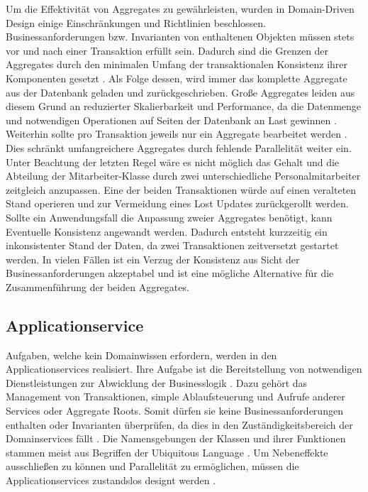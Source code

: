 Um die Effektivität von Aggregates zu gewährleisten, wurden in Domain-Driven Design einige Einschränkungen und Richtlinien beschlossen. Businessanforderungen bzw. Invarianten von enthaltenen Objekten müssen stets vor und nach einer Transaktion erfüllt sein. Dadurch sind die Grenzen der Aggregates durch den minimalen Umfang der transaktionalen Konsistenz ihrer Komponenten gesetzt \cite[S. 354]{Vernon.2015}. Als Folge dessen, wird immer das komplette Aggregate aus der Datenbank geladen und zurückgeschrieben. Große Aggregates leiden aus diesem Grund an reduzierter Skalierbarkeit und Performance, da die Datenmenge und notwendigen Operationen auf Seiten der Datenbank an Last gewinnen \cite[S. 355]{Vernon.2015}. Weiterhin sollte pro Transaktion jeweils nur ein Aggregate bearbeitet werden \cite[S. 354]{Vernon.2015}. Dies schränkt umfangreichere Aggregates durch fehlende Parallelität weiter ein. Unter Beachtung der letzten Regel wäre es nicht möglich das Gehalt und die Abteilung der Mitarbeiter-Klasse durch zwei unterschiedliche Personalmitarbeiter zeitgleich anzupassen. Eine der beiden Transaktionen würde auf einen veralteten Stand operieren und zur Vermeidung eines \Gls{Lost Update}s zurückgerollt werden. Sollte ein Anwendungsfall die Anpassung zweier Aggregates benötigt, kann Eventuelle Konsistenz angewandt werden. Dadurch entsteht kurzzeitig ein inkonsistenter Stand der Daten, da zwei Transaktionen zeitversetzt gestartet werden. In vielen Fällen ist ein Verzug der Konsistenz aus Sicht der Businessanforderungen akzeptabel und ist eine mögliche Alternative für die Zusammenführung der beiden Aggregates. \cite[S. 364]{Vernon.2015}

\subsection{Applicationservice}

Aufgaben, welche kein Domainwissen erfordern, werden in den Applicationservices realisiert. Ihre Aufgabe ist die Bereitstellung von notwendigen Dienstleistungen zur Abwicklung der Businesslogik \cite{Gorodinski.2012}. Dazu gehört das Management von Transaktionen, simple Ablaufsteuerung und Aufrufe anderer Services oder Aggregate Roots. Somit dürfen sie keine Businessanforderungen enthalten oder Invarianten überprüfen, da dies in den Zuständigkeitsbereich der Domainservices fällt \cite[S. 267]{Vernon.2015}. Die Namensgebungen der Klassen und ihrer Funktionen stammen meist aus Begriffen der Ubiquitous Language \cite[S. 105]{Evans.2011}. Um Nebeneffekte ausschließen zu können und Parallelität zu ermöglichen, müssen die Applicationservices zustandslos designt werden \cite[S. 105]{Evans.2011}. 

